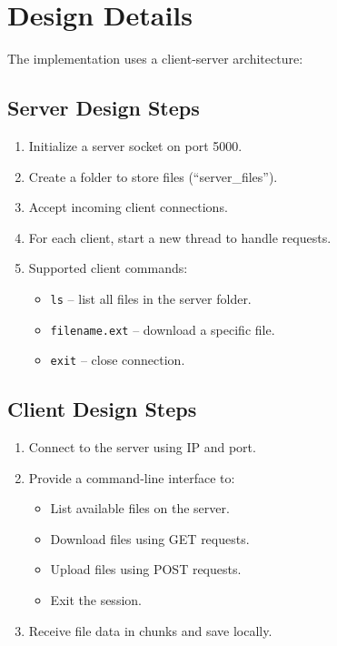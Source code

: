\documentclass{article}
\begin{document}
\section{Design Details}
The implementation uses a client-server architecture:

\subsection{Server Design Steps}
\begin{enumerate}
    \item Initialize a server socket on port 5000.
    \item Create a folder to store files (``server\_files'').
    \item Accept incoming client connections.
    \item For each client, start a new thread to handle requests.
    \item Supported client commands:
    \begin{itemize}
        \item \texttt{ls} -- list all files in the server folder.
        \item \texttt{filename.ext} -- download a specific file.
        \item \texttt{exit} -- close connection.
    \end{itemize}
\end{enumerate}

\subsection{Client Design Steps}
\begin{enumerate}
    \item Connect to the server using IP and port.
    \item Provide a command-line interface to:
    \begin{itemize}
        \item List available files on the server.
        \item Download files using GET requests.
        \item Upload files using POST requests.
        \item Exit the session.
    \end{itemize}
    \item Receive file data in chunks and save locally.
\end{enumerate}
\end{document}
